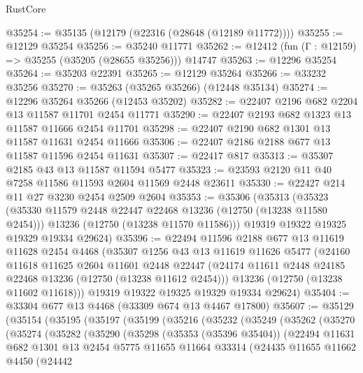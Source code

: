 \begin{lexlean}{RustCore}
\begin{coremodule}
@35254 := @35135 (@12179 (@22316 (@28648 (@12189 @11772))))
@35255 := @12129 @35254
@35256 := @35240 @11771
@35262 := @12412 (fun (Γ : @12159) => @35255 (@35205 (@28655 @35256))) @14747
@35263 := @12296 @35254
@35264 := @35203 @22391
@35265 := @12129 @35264
@35266 := @33232 @35256
@35270 := @35263 (@35265 @35266) (@12448 @35134)
@35274 := @12296 @35264 @35266 (@12453 @35202)
@35282 := @22407 @2196 @682 @2204 @13 @11587 @11701 @2454 @11771
@35290 := @22407 @2193 @682 @1323 @13 @11587 @11666 @2454 @11701
@35298 := @22407 @2190 @682 @1301 @13 @11587 @11631 @2454 @11666
@35306 := @22407 @2186 @2188 @677 @13 @11587 @11596 @2454 @11631
@35307 := @22417 @817
@35313 := @35307 @2185 @43 @13 @11587 @11594 @5477
@35323 := @23593 @2120 @11 @40 @7258 @11586 @11593 @2604 @11569 @2448 @23611
@35330 := @22427 @214 @11 @27 @3230 @2454 @2509 @2604
@35353 := @35306
    (@35313
      (@35323
        (@35330 @11579 @2448 @22447 @22468 @13236 (@12750 (@13238 @11580 @2454)))
        @13236
        (@12750 (@13238 @11570 @11586)))
      @19319
      @19322
      @19325
      @19329
      @19334
      @29624)
@35396 := @22494
    @11596
    @2188
    @677
    @13
    @11619
    @11628
    @2454
    @4468
    (@35307
      @1256
      @43
      @13
      @11619
      @11626
      @5477
      (@24160
        @11618
        @11625
        @2604
        @11601
        @2448
        @22447
        (@24174 @11611 @2448 @24185 @22468 @13236 (@12750 (@13238 @11612 @2454)))
        @13236
        (@12750 (@13238 @11602 @11618)))
      @19319
      @19322
      @19325
      @19329
      @19334
      @29624)
@35404 := @33304 @677 @13 @4468 (@33309 @674 @13 @4467 @17800)
@35607 := @35129
    (@35154
      (@35195
        (@35197
          (@35199
            (@35216
              (@35232
                (@35249
                  (@35262
                    (@35270
                      (@35274
                        (@35282
                          (@35290
                            (@35298
                              (@35353 (@35396 @35404))
                              (@22494
                                @11631
                                @682
                                @1301
                                @13
                                @2454
                                @5775
                                @11655
                                @11664
                                @33314
                                (@24435
                                  @11655
                                  @11662
                                  @4450
                                  (@24442

\end{coremodule}
\end{lexlean}
